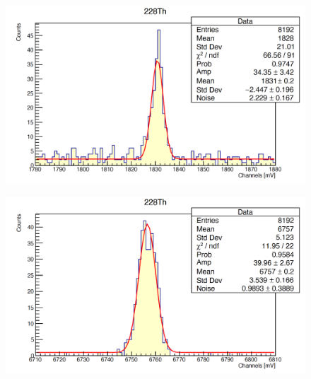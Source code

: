 \documentclass[a4paper,10pt]{article}
\begin{document}
\begin{figure}[H]
    \centering
    \includegraphics[scale=0.45]{appendice/Th4}
\end{figure}
\begin{figure}[H]
    \centering
    \includegraphics[scale=0.45]{appendice/Th5}
\end{figure}

\end{document}
